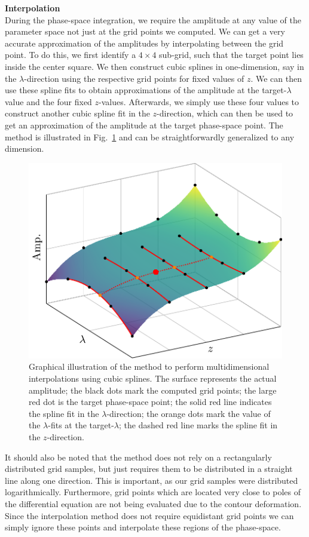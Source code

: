 \textbf{Interpolation}\\
During the phase-space integration, we require the amplitude at any value of the parameter space not just at the grid points we computed. We can get a very accurate approximation of the amplitudes by interpolating between the grid point. To do this, we first identify a $4\times 4$ sub-grid, such that the target point lies inside the center square. We then construct cubic splines in one-dimension, say in the $\lambda$-direction using the respective grid points for fixed values of $z$. We can then use these spline fits to obtain approximations of the amplitude at the target-$\lambda$ value and the four fixed $z$-values. Afterwards, we simply use these four values to construct another cubic spline fit in the $z$-direction, which can then be used to get an approximation of the amplitude at the target phase-space point. The method is illustrated in Fig.~\ref{fig:5:interpolation} and can be straightforwardly generalized to any dimension.
\begin{figure}[h]
\centering
\includegraphics[scale=0.6]{Images/interpolation.pdf}
\caption{Graphical illustration of the method to perform multidimensional interpolations using cubic splines. The surface represents the actual amplitude; the black dots mark the computed grid points; the large red dot is the target phase-space point; the solid red line indicates the spline fit in the $\lambda$-direction; the orange dots mark the value of the $\lambda$-fits at the target-$\lambda$; the dashed red line marks the spline fit in the $z$-direction.}
\label{fig:5:interpolation}
\end{figure}
It should also be noted that the method does not rely on a rectangularly distributed grid samples, but just requires them to be distributed in a straight line along one direction. This is important, as our grid samples were distributed logarithmically. Furthermore, grid points which are located very close to poles of the differential equation are not being evaluated due to the contour deformation. Since the interpolation method does not require equidistant grid points we can simply ignore these points and interpolate these regions of the phase-space.

